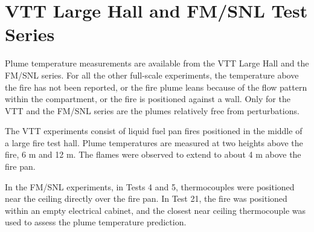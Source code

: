 \clearpage

\section{VTT Large Hall and FM/SNL Test Series}

Plume temperature measurements are available from the VTT Large Hall and the FM/SNL series.
For all the other full-scale experiments, the temperature above the fire has not been reported, or the fire plume
leans because of the flow pattern within the compartment, or the fire is positioned against a wall.
Only for the VTT and the FM/SNL series are the plumes relatively free from perturbations.

The VTT experiments consist of liquid fuel pan fires positioned in the middle of a large fire test hall.
Plume temperatures are measured at two heights above the fire, 6 m and 12 m.
The flames were observed to extend to about 4 m above the fire pan.




In the FM/SNL experiments, in Tests 4 and 5, thermocouples were positioned near the ceiling directly over the fire pan.
In Test 21, the fire was positioned within an empty electrical cabinet, and the closest near ceiling thermocouple
was used to assess the plume temperature prediction.

